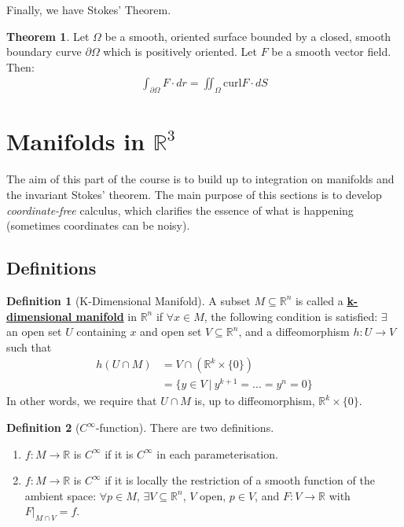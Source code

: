 \documentclass[11pt]{scrartcl}
\newcommand{\R}[0]{\mathbb{R}}
\theoremstyle{definition}
\newtheorem{theorem}{Theorem}
\newtheorem{definition}{Definition}
\theoremstyle{remark}
\newcommand{\dfn}[1]{\textbf{\underline{#1}}}
\newcommand{\idx}[2]{\int_{#1}^{#2}}
\begin{document}
{Finally, we have Stokes' Theorem. 

\begin{theorem}
	Let $\Omega$ be a smooth, oriented surface bounded by a closed, smooth boundary curve $\partial \Omega$ which is positively oriented. Let $F$ be a smooth vector field. Then: 
	\begin{align}
		\idx{\partial \Omega}{} F \cdot dr = \iint_{\Omega} \text{curl} F \cdot dS 	
	\end{align}

\end{theorem}

\section{Manifolds in $\R^3$}
The aim of this part of the course is to build up to integration on manifolds and the invariant Stokes' theorem. The main purpose of this sections is to develop \emph{coordinate-free} calculus, which clarifies the essence of what is happening (sometimes coordinates can be noisy). 
\subsection{Definitions}

\begin{definition}[K-Dimensional Manifold]
	A subset $M \subseteq \R^n$ is called a \dfn{k-dimensional manifold} in $\R^n$ if $\forall x \in M$, the following condition is satisfied: $\exists$ an open set $U$ containing $x$ and open set $V \subseteq \R^n$, and a diffeomorphism $h: U \rightarrow V$ such that 
	\begin{align*}
		h (U \cap M) & = V \cap (\R^k \times \{ 0 \} ) \\
					& = \{ y \in V\ |\ y^{k+1} = ... = y^n = 0 \} 
	\end{align*}
	In other words, we require that $U \cap M$ is, up to diffeomorphism, $\R^k \times \{ 0 \}$. 
\end{definition}

\begin{definition}[$C^\infty$-function] There are two definitions. 
	\begin{enumerate}[noitemsep] 
		\item $f: M \rightarrow \R$ is $C^\infty$ if it is $C^\infty$ in each parameterisation. 
		\item $f: M \rightarrow \R$ is $C^\infty$ if it is locally the restriction of a smooth function of the ambient space: $\forall p \in M$, $\exists V \subseteq \R^n$, $V$ open, $ p \in V$, and $F: V \rightarrow \R$ with $F|_{M \cap V} = f$. 
	\end{enumerate}
\end{definition}

}
\end{document}
